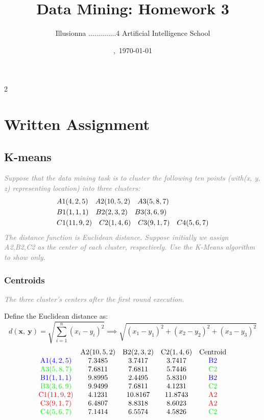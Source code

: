 \documentclass{article}
\title{Data Mining: Homework 3}
\author{Illusionna \quad 2025..............4 \quad Artificial Intelligence School}
\date{\currenttime,\ \today}
\begin{document}
\maketitle
\begin{spacing}{2}
    \tableofcontents
\end{spacing}
\thispagestyle{empty}
\clearpage
\setcounter{page}{1}


\section{Written Assignment}
\subsection{K-means}
\textcolor{gray}{\it Suppose that the data mining task is to cluster the following ten points (with(x, y, z) representing location) into three clusters:}
\textcolor{gray}{
    \begin{align*}
        \rm\color{gray}& A1(4,2,5) \quad A2(10,5,2) \quad A3(5,8,7)
        \\
        \rm& B1(1,1,1) \quad B2(2,3,2) \quad B3(3,6,9)
        \\
        \rm& C1(11,9,2) \quad C2(1,4,6) \quad C3(9,1,7) \quad C4(5,6,7)
    \end{align*}
}
\textcolor{gray}{\it The distance function is Euclidean distance. Suppose initially we assign A2,B2,C2 as the center of each cluster, respectively. Use the K-Means algorithm to show only.}



\subsubsection{Centroids}
\textcolor{gray}{\it The three cluster's centers after the first round execution.}

Define the Euclidean distance as:
\[ d(\bm{x},\ \bm{y})=\sqrt{\displaystyle\sum_{i=1}^n(x_i-y_i)^2}\implies\sqrt{\displaystyle(x_1-y_1)^2+(x_2-y_2)^2+(x_3-y_3)^2} \]
\begin{align*}
    \begin{matrix}
         & \rm A2(10,5,2) & \rm B2(2,3,2) & \rm C2(1,4,6) & \rm Centroid \\
        \rm \color{blue}A1(4,2,5) & 7.3485 & 3.7417 & 3.7417 & \rm \color{blue}B2 \\
        \rm \color{green}A3(5,8,7) & 7.6811 & 7.6811 & 5.7446 & \rm \color{green}C2 \\
        \rm \color{blue}B1(1,1,1) & 9.8995 & 2.4495 & 5.8310 & \rm \color{blue}B2 \\
        \rm \color{green}B3(3,6,9) & 9.9499 & 7.6811 & 4.1231 & \rm \color{green}C2 \\
        \rm \color{red}C1(11,9,2) & 4.1231 & 10.8167 & 11.8743 & \rm \color{red}A2 \\
        \rm \color{red}C3(9,1,7) & 6.4807 & 8.8318 & 8.6023 & \rm \color{red}A2 \\
        \rm \color{green}C4(5,6,7) & 7.1414 & 6.5574 & 4.5826 & \rm \color{green}C2 \\
    \end{matrix}
\end{align*}
\end{document}
